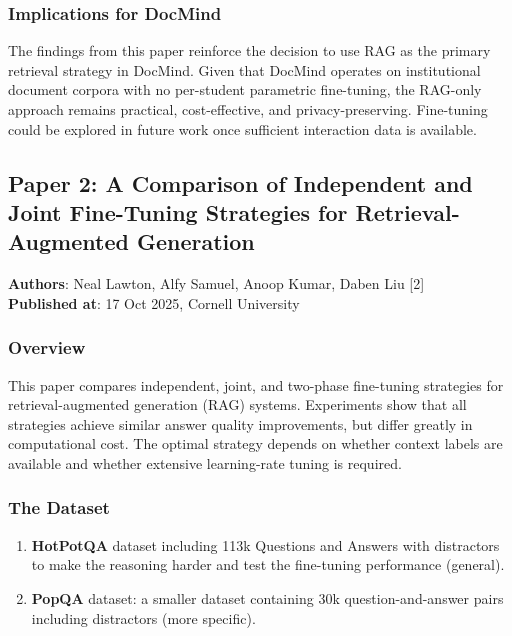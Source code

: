 \documentclass[12pt, a4paper, oneside]{report}
\let\oldsubsection\subsection
\renewcommand{\subsection}{%
  \addtocontents{toc}{\protect\needspace{3\baselineskip}}%
  \oldsubsection
}
\begin{document}
\subsubsection{Implications for DocMind}

The findings from this paper reinforce the decision to use RAG as the primary retrieval strategy in DocMind. Given that DocMind operates on institutional document corpora with no per-student parametric fine-tuning, the RAG-only approach remains practical, cost-effective, and privacy-preserving. Fine-tuning could be explored in future work once sufficient interaction data is available.

\subsection{Paper 2: A Comparison of Independent and Joint Fine-Tuning Strategies for Retrieval-Augmented Generation}

\textbf{Authors}: Neal Lawton, Alfy Samuel, Anoop Kumar, Daben Liu [2]\\
\textbf{Published at}: 17 Oct 2025, Cornell University

\subsubsection{Overview}

This paper compares independent, joint, and two-phase fine-tuning strategies for retrieval-augmented generation (RAG) systems. Experiments show that all strategies achieve similar answer quality improvements, but differ greatly in computational cost. The optimal strategy depends on whether context labels are available and whether extensive learning-rate tuning is required.

\subsubsection{The Dataset}

\begin{enumerate}
  \item \textbf{HotPotQA} dataset including 113k Questions and Answers with distractors to make the reasoning harder and test the fine-tuning performance (general).
  \item \textbf{PopQA} dataset: a smaller dataset containing 30k question-and-answer pairs including distractors (more specific).
\end{enumerate}
\newpage
\end{document}
